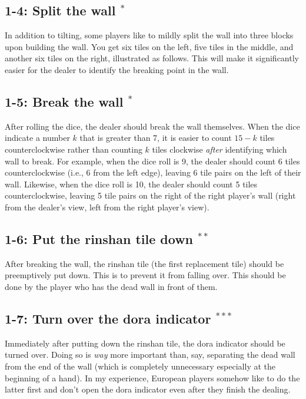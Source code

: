 \subsection*{1-4: Split the wall $^{*}$}
In addition to tilting, some players like to mildly split the wall into three blocks upon building the wall. You get six tiles on the left, five tiles in the middle, and another six tiles on the right, illustrated as follows. 
\bp
{}
\ep
This will make it significantly easier for the dealer to identify the breaking point in the wall. 

\subsection*{1-5: Break the wall $^{*}$}
After rolling the dice, the dealer should break the wall themselves. When the dice indicate a number $k$ that is greater than 7, it is easier to count $15-k$ tiles counterclockwise rather than counting $k$ tiles clockwise \emph{after} identifying which wall to break. 
For example, when the dice roll is 9, the dealer should count 6 tiles counterclockwise (i.e., 6 from the left edge), leaving 6 tile pairs on the left of their wall. Likewise, when the dice roll is 10, the dealer should count 5 tiles counterclockwise, leaving 5 tile pairs on the right of the right player's wall (right from the dealer's view, left from the right player's view). 

\subsection*{1-6: Put the {\jap rinshan} tile down $^{**}$}
After breaking the wall, the {\jap rinshan} tile (the first replacement tile) should be preemptively put down. This is to prevent it from falling over. This should be done by the player who has the dead wall in front of them. 

\subsection*{1-7: Turn over the {\jap dora} indicator $^{***}$}
Immediately after putting down the {\jap rinshan} tile, the {\jap dora} indicator should be turned over. Doing so is \emph{way} more important than, say, separating the dead wall from the end of the wall (which is completely unnecessary especially at the beginning of a hand). In my experience, European players somehow like to do the latter first and don't open the {\jap dora} indicator even after they finish the dealing. 

